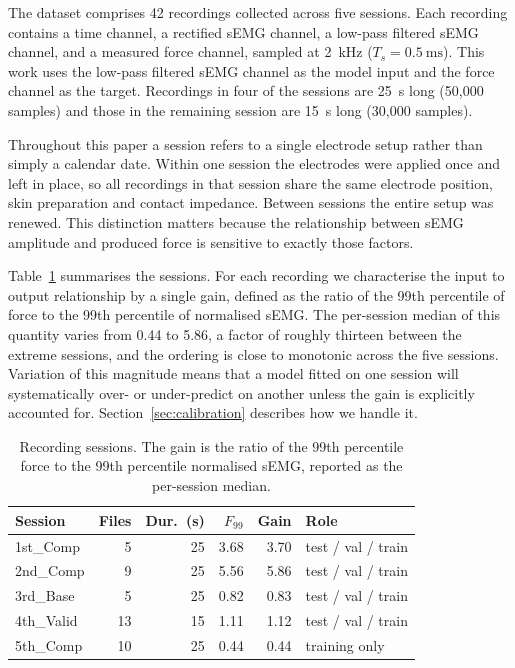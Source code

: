 The dataset comprises 42 recordings collected across five sessions. Each
recording contains a time channel, a rectified sEMG channel, a low-pass filtered
sEMG channel, and a measured force channel, sampled at \SI{2}{\kilo\hertz}
($T_s = \SI{0.5}{\milli\second}$). This work uses the low-pass filtered sEMG
channel as the model input and the force channel as the target. Recordings in
four of the sessions are \SI{25}{\second} long (50{,}000 samples) and those in
the remaining session are \SI{15}{\second} long (30{,}000 samples).

Throughout this paper a session refers to a single electrode setup rather than
simply a calendar date. Within one session the electrodes were applied once and
left in place, so all recordings in that session share the same electrode
position, skin preparation and contact impedance. Between sessions the entire
setup was renewed. This distinction matters because the relationship between
sEMG amplitude and produced force is sensitive to exactly those factors.

Table~\ref{tab:sessions} summarises the sessions. For each recording we
characterise the input to output relationship by a single gain, defined as the
ratio of the 99th percentile of force to the 99th percentile of normalised sEMG.
The per-session median of this quantity varies from 0.44 to 5.86, a factor of
roughly thirteen between the extreme sessions, and the ordering is close to
monotonic across the five sessions. Variation of this magnitude means that a
model fitted on one session will systematically over- or under-predict on
another unless the gain is explicitly accounted for. Section~\ref{sec:calibration}
describes how we handle it.

\begin{table}[!t]
\caption{Recording sessions. The gain is the ratio of the 99th percentile force
to the 99th percentile normalised sEMG, reported as the per-session median.}
\label{tab:sessions}
\centering
\begin{tabular}{lrrrrl}
\toprule
Session & Files & Dur.~(s) & $F_{99}$ & Gain & Role \\
\midrule
1st\_Comp  & 5  & 25 & 3.68 & 3.70 & test / val / train \\
2nd\_Comp  & 9  & 25 & 5.56 & 5.86 & test / val / train \\
3rd\_Base  & 5  & 25 & 0.82 & 0.83 & test / val / train \\
4th\_Valid & 13 & 15 & 1.11 & 1.12 & test / val / train \\
5th\_Comp  & 10 & 25 & 0.44 & 0.44 & training only \\
\bottomrule
\end{tabular}
\end{table}

